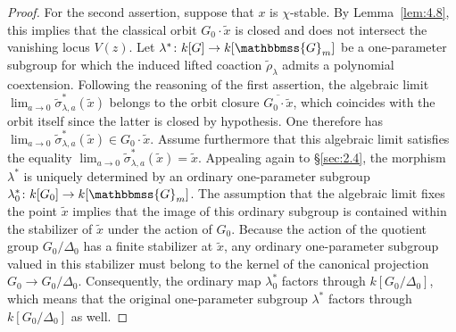 \documentclass[11pt,a4paper,reqno,noamsfonts]{amsart}
\numberwithin{equation}{section}
\theoremstyle{definition}
\theoremstyle{remark}
\newcommand{\GG}{\ensuremath{\mathbbmss{G}}}
\begin{document}
\begin{proof}
For the second assertion, suppose that $x$ is $\chi$-stable. By Lemma~\ref{lem:4.8}, this implies that the classical orbit $G_0 \cdot \tilde{x}$ is closed and does not intersect the vanishing locus $V(z)$. Let $\lambda^* \colon k[G] \to k[\GG_m]$ be a one-parameter subgroup for which the induced lifted coaction $\tilde{\rho}_{\lambda}$ admits a polynomial coextension. Following the reasoning of the first assertion, the algebraic limit $\displaystyle \lim_{a \to 0} \tilde{\sigma}_{\lambda,a}^*(\tilde{x})$ belongs to the orbit closure $\overline{G_0 \cdot \tilde{x}}$, which coincides with the orbit itself since the latter is closed by hypothesis. One therefore has $\displaystyle \lim_{a \to 0} \tilde{\sigma}_{\lambda,a}^*(\tilde{x}) \in G_0 \cdot \tilde{x}$. Assume furthermore that this algebraic limit satisfies the equality $\displaystyle \lim_{a \to 0} \tilde{\sigma}_{\lambda,a}^*(\tilde{x}) = \tilde{x}$. Appealing again to \S\ref{sec:2.4}, the morphism $\lambda^*$ is uniquely determined by an ordinary one-parameter subgroup $\lambda_0^* \colon k[G_0] \to k[\GG_m]$. The assumption that the algebraic limit fixes the point $\tilde{x}$ implies that the image of this ordinary subgroup is contained within the stabilizer of $\tilde{x}$ under the action of $G_0$. Because the action of the quotient group $G_0/\Delta_0$ has a finite stabilizer at $\tilde{x}$, any ordinary one-parameter subgroup valued in this stabilizer must belong to the kernel of the canonical projection $G_0 \to G_0/\Delta_0$. Consequently, the ordinary map $\lambda_0^*$ factors through $k[G_0/\Delta_0]$, which means that the original one-parameter subgroup $\lambda^*$ factors through $k[G_0/\Delta_0]$ as well.


\end{proof}
\end{document}
